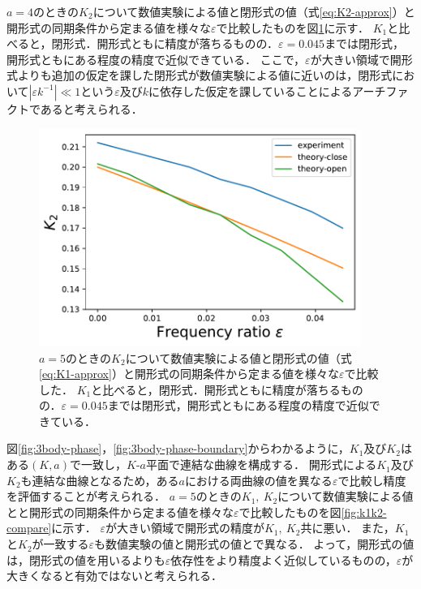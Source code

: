 \documentclass[../main]{subfiles}
\begin{document}
$a=4$のときの$K_2$について数値実験による値と閉形式の値（式\eqref{eq:K2-approx}）と開形式の同期条件から定まる値を様々な$\varepsilon$で比較したものを図\ref{fig:k2-compare}に示す．
$K_1$と比べると，閉形式．開形式ともに精度が落ちるものの．$\varepsilon=0.045$までは閉形式，開形式ともにある程度の精度で近似できている．
ここで，$\varepsilon$が大きい領域で開形式よりも追加の仮定を課した閉形式が数値実験による値に近いのは，閉形式において$|\varepsilon k^{-1}|\ll 1$という$\varepsilon$及び$k$に依存した仮定を課していることによるアーチファクトであると考えられる．

\begin{figure}[tbp]
\centering
\includegraphics[width=105mm]{./images/k2-compare.pdf}
\centering
\caption{$a=5$のときの$K_2$について数値実験による値と閉形式の値（式\eqref{eq:K1-approx}）と開形式の同期条件から定まる値を様々な$\varepsilon$で比較した．
$K_1$と比べると，閉形式．開形式ともに精度が落ちるものの．$\varepsilon=0.045$までは閉形式，開形式ともにある程度の精度で近似できている．}
\label{fig:k2-compare}
\end{figure}

図\ref{fig:3body-phase}，\ref{fig:3body-phase-boundary}からわかるように，$K_1$及び$K_2$はある$(K,a)$で一致し，$K$-$a$平面で連結な曲線を構成する．
開形式による$K_1$及び$K_2$も連結な曲線となるため，ある$a$における両曲線の値を異なる$\varepsilon$で比較し精度を評価することが考えられる．
$a=5$のときの$K_1,\ K_2$について数値実験による値とと開形式の同期条件から定まる値を様々な$\varepsilon$で比較したものを図\ref{fig:k1k2-compare}に示す．
$\varepsilon$が大きい領域で開形式の精度が$K_1,\ K_2$共に悪い．
また，$K_1$と$K_2$が一致する$\varepsilon$も数値実験の値と開形式の値とで異なる．
よって，開形式の値は，閉形式の値を用いるよりも$\varepsilon$依存性をより精度よく近似しているものの，$\varepsilon$が大きくなると有効ではないと考えられる．
\end{document}
